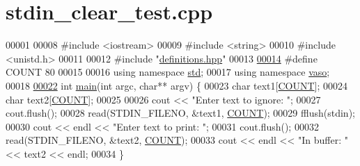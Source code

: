 \hypertarget{stdin__clear__test_8cpp_source}{\section{stdin\+\_\+clear\+\_\+test.\+cpp}
\label{stdin__clear__test_8cpp_source}
}

\begin{DoxyCode}
00001 
00008 \textcolor{preprocessor}{#include <iostream>}
00009 \textcolor{preprocessor}{#include <string>}
00010 \textcolor{preprocessor}{#include <unistd.h>}
00011 
00012 \textcolor{preprocessor}{#include "\hyperlink{definitions_8hpp}{definitions.hpp}"}
00013 
\hypertarget{stdin__clear__test_8cpp_source_l00014}{}\hyperlink{stdin__clear__test_8cpp_a698c124f1c293f98840449d6c5b9d984}{00014} \textcolor{preprocessor}{#define COUNT 80}
00015 
00016 \textcolor{keyword}{using namespace }\hyperlink{namespacestd}{std};
00017 \textcolor{keyword}{using namespace }\hyperlink{namespacevaso}{vaso};
00018 
\hypertarget{stdin__clear__test_8cpp_source_l00022}{}\hyperlink{stdin__clear__test_8cpp_a3c04138a5bfe5d72780bb7e82a18e627}{00022} \textcolor{keywordtype}{int} \hyperlink{stdin__clear__test_8cpp_a3c04138a5bfe5d72780bb7e82a18e627}{main}(\textcolor{keywordtype}{int} argc, \textcolor{keywordtype}{char}** argv) \{
00023     \textcolor{keywordtype}{char} text1[\hyperlink{stdin__clear__test_8cpp_a698c124f1c293f98840449d6c5b9d984}{COUNT}];
00024     \textcolor{keywordtype}{char} text2[\hyperlink{stdin__clear__test_8cpp_a698c124f1c293f98840449d6c5b9d984}{COUNT}];
00025 
00026     cout << \textcolor{stringliteral}{"Enter text to ignore: "};
00027     cout.flush();
00028     read(STDIN\_FILENO, &text1, \hyperlink{stdin__clear__test_8cpp_a698c124f1c293f98840449d6c5b9d984}{COUNT});
00029     fflush(stdin);
00030     cout << endl << \textcolor{stringliteral}{"Enter text to print: "};
00031     cout.flush();
00032     read(STDIN\_FILENO, &text2, \hyperlink{stdin__clear__test_8cpp_a698c124f1c293f98840449d6c5b9d984}{COUNT});
00033     cout << endl << \textcolor{stringliteral}{"In buffer: "} << text2 << endl;
00034 \}
\end{DoxyCode}
